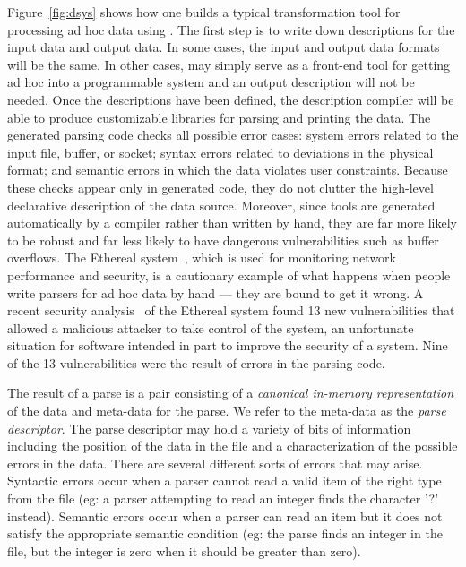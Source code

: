 \documentclass[11pt]{article}
\begin{document}
Figure~\ref{fig:dsys} shows how one builds a typical transformation
tool for processing ad hoc data using \datatype{}.  The first step is
to write down \datatype{} descriptions for the input data and output
data.  In some cases, the input
and output data formats will be the same.  In other cases, \datatype{}
may simply serve as a front-end tool for getting ad hoc into a
programmable system and an output description will not be needed.
Once the descriptions have been defined, the \datatype{} description
compiler will be able to produce customizable libraries for parsing
and printing the data.  The generated parsing code checks all possible
error cases: system errors related to the input file, buffer, or
socket; syntax errors related to deviations in the physical format;
and semantic errors in which the data violates user constraints.
Because these checks appear only in generated code, they do not
clutter the high-level declarative description of the data source.
Moreover, since tools are generated automatically by a compiler rather
than written by hand, they are far more likely to be robust and far
less likely to have dangerous vulnerabilities such as buffer
overflows.  The Ethereal system~\cite{ethereal}, which is used for
monitoring network performance and security, is a cautionary example
of what happens when people write parsers for ad hoc data by hand ---
they are bound to get it wrong.  A recent security analysis~\cite{etherealvulnerabilities} of the
Ethereal system found 13 new vulnerabilities
that allowed a malicious attacker to take control of the system, an
unfortunate situation for software intended in part to improve the
security of a system. Nine of the 13 vulnerabilities
were the result of errors in the
parsing code.


The result of a parse is a pair consisting of a {\em canonical
in-memory representation} of the data and meta-data for the parse.  We
refer to the meta-data as the {\em parse descriptor}. The parse
descriptor may hold a variety of bits of information including
the position of the data in the file and a characterization
of the possible errors in the data.  There are several
different sorts of errors that may arise.  Syntactic errors occur
when a parser cannot read a valid item of the right type from the file 
(eg: a parser attempting to read an integer finds the character '?'
instead).  Semantic errors occur when a parser can read an item
but it does not satisfy the appropriate semantic condition (eg: the
parse finds an integer in the file, but the integer is zero when it
should be greater than zero).  
\end{document}
